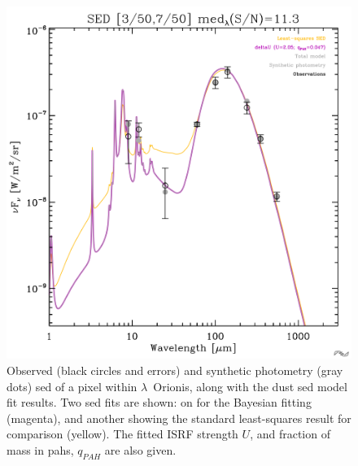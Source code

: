               \begin{figure}
                \includegraphics[width=\textwidth]{../Plots/ch_lori/fred_LOri_notes_Oct2017_fig1a.pdf}
                \centering
                \caption{Observed (black circles and errors) and synthetic photometry (gray dots) \acrshort{sed} of a pixel within $\lambda$~Orionis, along with the dust \acrshort{sed} model fit results. Two \acrshort{sed} fits are shown: on for the Bayesian fitting (magenta), and another showing the standard least-squares result for comparison (yellow). The fitted ISRF strength $U$, and fraction of mass in \acrshort{pah}s, $q_{PAH}$ are also given.}
                \label{fig:fred_LOri_notes_Oct2017_fig1a}
              \end{figure}
